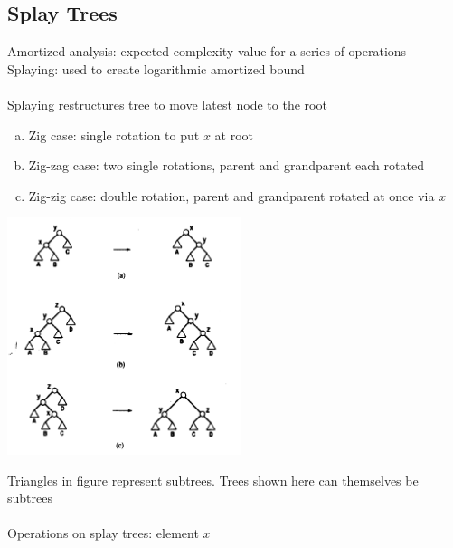\documentclass{article}
\begin{document}
		\subsection{Splay Trees}
			Amortized analysis: expected complexity value for a series of operations \\
			Splaying: used to create logarithmic amortized bound \\
			\\
			Splaying restructures tree to move latest node to the root
			\begin{enumerate}[(a)]
				\item Zig case: single rotation to put $x$ at root
				\item Zig-zag case: two single rotations, parent and grandparent each rotated
				\item Zig-zig case: double rotation, parent and grandparent rotated at once via $x$
				\end{enumerate}
			\begin{center}
				\includegraphics[width = 2.7in]{splaying.png}
				\end{center}
			Triangles in figure represent subtrees. Trees shown here can themselves be subtrees \\
			\\
			Operations on splay trees: element $x$
\end{document}
